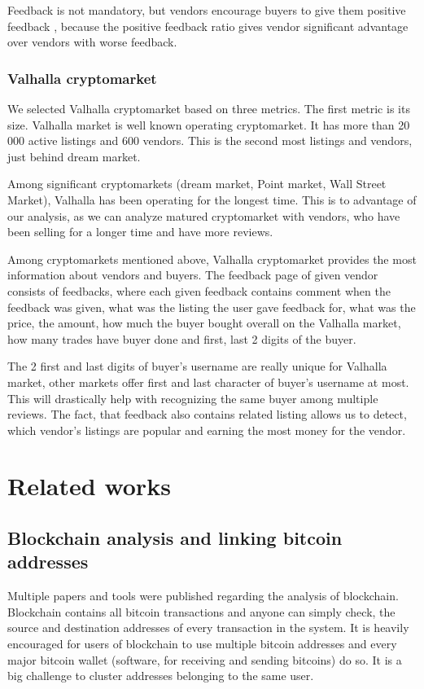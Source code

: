 \documentclass[
  digital, %
  table,   %
  lof,     %
  lot,     %
  oneside
]{fithesis3}
\begin{document}
Feedback is not mandatory, but vendors encourage buyers to give them positive feedback
\parencite{aldridge2014not}\parencite{soska2015measuring}, because the positive feedback
ratio gives vendor significant advantage over vendors with worse feedback.

\subsection{Valhalla cryptomarket}

We selected Valhalla cryptomarket based on three metrics.
The first metric is its size. Valhalla market is well known operating cryptomarket.
It has more than 20 000 active listings and 600 vendors.
This is the second most listings and vendors, just behind dream market.

Among significant cryptomarkets (dream market, Point market, Wall Street Market), Valhalla
has been operating for the longest time. This is to advantage of our analysis, as we can analyze matured cryptomarket with vendors, who have been selling for a longer time and have more reviews.

Among cryptomarkets mentioned above,
Valhalla cryptomarket provides the most information about vendors and buyers.
The feedback page of given vendor consists of feedbacks, where
each given feedback contains comment when the feedback was given,
what was the listing the user gave feedback for, what was the price,
the amount, how much the buyer bought overall on the Valhalla market,
how many trades have buyer done and first, last 2 digits of the buyer.

The 2 first and last digits of buyer's username are really unique for Valhalla market,
other markets offer first and last character of buyer's username at most.
This will drastically help with recognizing the same buyer among multiple reviews.
The fact, that feedback also contains related listing allows us to
detect, which vendor's listings are popular and earning the most money for the vendor.

\chapter{Related works}
\section{Blockchain analysis and linking bitcoin addresses}

Multiple papers and tools were published regarding the analysis of blockchain.
Blockchain contains all bitcoin transactions and anyone can simply check,
the source and destination addresses of every transaction in the system.
It is heavily encouraged for users of blockchain to use multiple bitcoin addresses
 and every major bitcoin wallet (software, for receiving and sending bitcoins) do so.
 It is a big challenge to cluster addresses belonging to the same user.
 
\end{document}
